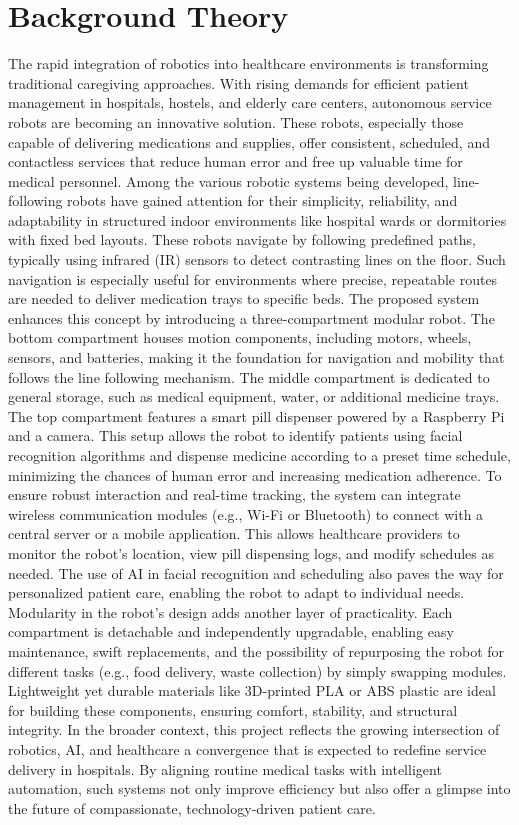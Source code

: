 \section{Background Theory}
The rapid integration of robotics into healthcare environments is transforming traditional caregiving approaches. With rising demands for efficient patient management in hospitals, hostels, and elderly care centers, autonomous service robots are becoming an innovative solution. These robots, especially those capable of delivering medications and supplies, offer consistent, scheduled, and contactless services that reduce human error and free up valuable time for medical personnel.
Among the various robotic systems being developed, line-following robots have gained attention for their simplicity, reliability, and adaptability in structured indoor environments like hospital wards or dormitories with fixed bed layouts. These robots navigate by following predefined paths, typically using infrared (IR) sensors to detect contrasting lines on the floor. Such navigation is especially useful for environments where precise, repeatable routes are needed to deliver medication trays to specific beds.
The proposed system enhances this concept by introducing a three-compartment modular robot. The bottom compartment houses motion components, including motors, wheels, sensors, and batteries, making it the foundation for navigation and mobility that follows the line following mechanism. The middle compartment is dedicated to general storage, such as medical equipment, water, or additional medicine trays. The top compartment features a smart pill dispenser powered by a Raspberry Pi and a camera. This setup allows the robot to identify patients using facial recognition algorithms and dispense medicine according to a preset time schedule, minimizing the chances of human error and increasing medication adherence.
To ensure robust interaction and real-time tracking, the system can integrate wireless communication modules (e.g., Wi-Fi or Bluetooth) to connect with a central server or a mobile application. This allows healthcare providers to monitor the robot’s location, view pill dispensing logs, and modify schedules as needed. The use of AI in facial recognition and scheduling also paves the way for personalized patient care, enabling the robot to adapt to individual needs.
Modularity in the robot’s design adds another layer of practicality. Each compartment is detachable and independently upgradable, enabling easy maintenance, swift replacements, and the possibility of repurposing the robot for different tasks (e.g., food delivery, waste collection) by simply swapping modules. Lightweight yet durable materials like 3D-printed PLA or ABS plastic are ideal for building these components, ensuring comfort, stability, and structural integrity.
In the broader context, this project reflects the growing intersection of robotics, AI, and healthcare a convergence that is expected to redefine service delivery in hospitals. By aligning routine medical tasks with intelligent automation, such systems not only improve efficiency but also offer a glimpse into the future of compassionate, technology-driven patient care.



